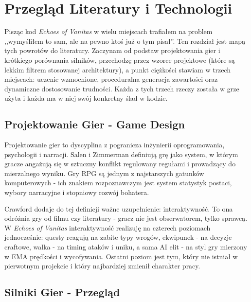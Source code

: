 \newcommand{\package}[1]{\textbf{#1}}
\newcommand{\cmmd}[1]{\textbackslash\texttt{#1}}

\chapter{Przegląd Literatury i Technologii}

Pisząc kod \textit{Echoes of Vanitas} w wielu miejscach trafiałem na problem ,,wymyśliłem to sam, ale na pewno ktoś już o tym pisał''. Ten rozdział jest mapą tych powrotów do literatury. Zaczynam od podstaw projektowania gier i krótkiego porównania silników, przechodzę przez wzorce projektowe (które są lekkim filtrem stosowanej architektury), a punkt ciężkości stawiam w trzech miejscach: uczenie wzmocnione, proceduralna generacja zawartości oraz dynamiczne dostosowanie trudności. Każda z tych trzech rzeczy została w grze użyta i każda ma w niej swój konkretny ślad w kodzie.

\section{Projektowanie Gier - Game Design}

Projektowanie gier to dyscyplina z pogranicza inżynierii oprogramowania, psychologii i narracji. Salen i Zimmerman \cite{salen2004rules} definiują grę jako system, w którym gracze angażują się w sztuczny konflikt regulowany regułami i prowadzący do mierzalnego wyniku. Gry RPG są jednym z najstarszych gatunków komputerowych - ich znakiem rozpoznawczym jest system statystyk postaci, wybory narracyjne i stopniowy rozwój bohatera.

Crawford \cite{crawford2003chris} dodaje do tej definicji ważne uzupełnienie: interaktywność. To ona odróżnia gry od filmu czy literatury - gracz nie jest obserwatorem, tylko sprawcą. W \textit{Echoes of Vanitas} interaktywność realizuję na czterech poziomach jednocześnie: questy reagują na zabite typy wrogów, ekwipunek - na decyzje craftowe, walka - na timing ataków i uniku, a sama AI elit - na styl gry mierzony w EMA prędkości i wycofywania. Ostatni poziom jest tym, który nie istniał w pierwotnym projekcie i który najbardziej zmienił charakter pracy.

\section{Silniki Gier - Przegląd}

